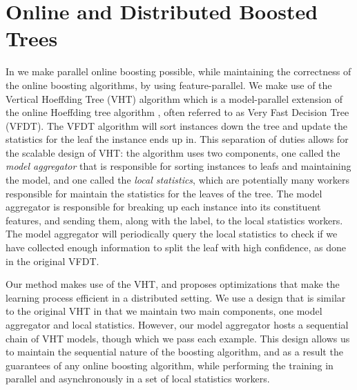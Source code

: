 \section{Online and Distributed Boosted Trees}
\label{sec:boostvht-method}

In \boostvht we make parallel online boosting possible, while maintaining the
correctness of the online boosting algorithms, by using feature-parallel. 
We make use of the Vertical Hoeffding Tree (VHT) algorithm \cite{kourtellis2016vht} which is a model-parallel
extension of the online Hoeffding tree algorithm \cite{vfdt}, often referred to as
Very Fast Decision Tree (VFDT).
The VFDT algorithm will sort instances down the tree and update the statistics for the
leaf the instance ends up in. This separation of duties allows for the scalable design of
VHT: the algorithm uses two components, one called the \emph{model aggregator}
that is responsible for sorting instances to leafs and maintaining the model, and
one called the \emph{local statistics}, which are potentially many workers responsible
for maintain the statistics for the leaves of the tree.
The model aggregator is responsible for breaking up each instance into its constituent
features, and sending them, along with the label, to the local statistics workers.
The model aggregator will periodically query the local statistics to check if we have
collected enough information to split the leaf with high confidence, as done in the
original VFDT.

Our method makes use of the VHT,
and proposes optimizations that make the learning process efficient in a distributed
setting. We use a design that is similar to the original VHT in that we maintain
two main components, one model aggregator and local statistics. However, our model
aggregator hosts a sequential chain of VHT models, though which we pass each example.
This design allows us to maintain the sequential nature of the boosting algorithm,
and as a result the guarantees of any online boosting algorithm, while performing
the training in parallel and asynchronously in a set of local statistics workers.

